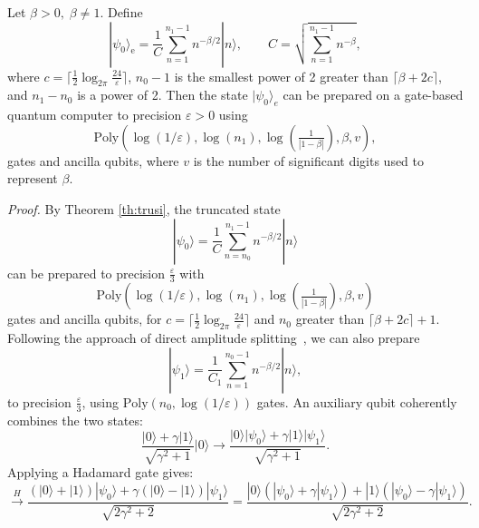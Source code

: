 \documentclass[aps,pra,twocolumn,superscriptaddress,preprintnumbers,amsmath,amssymb]{revtex4-2}
\begin{document}
\begin{corollary}
    \label{co:extended}

    Let $\beta>0,\;\beta\neq1$. Define 
    \begin{equation}
        |\psi_0\rangle_{\mathrm{e}}=\frac{1}{C}\sum_{n=1}^{n_1-1}n^{-\beta/2}|n\rangle, \qquad C=\sqrt{\sum_{n=1}^{n_1-1}n^{-\beta}},
    \end{equation}
    where $c = \lceil \frac{1}{2} \log_{2\pi} \frac{24}{\varepsilon} \rceil$, $n_0 - 1$ is the smallest power of 2 greater than $\lceil \beta + 2c \rceil$, and $n_1 - n_0$ is a power of 2. Then the state $|\psi_0\rangle_e$ can be prepared on a gate-based quantum computer to precision $\varepsilon > 0$ using
    \begin{equation}
        \mathrm{Poly}(\log(1/\varepsilon),\log(n_1),\log(\tfrac{1}{|1-\beta|}),\beta,v),
    \end{equation}
    gates and ancilla qubits, where $v$ is the number of significant digits used to represent $\beta$.
\end{corollary}
\noindent\textit{Proof.} 
By Theorem \ref{th:trusi}, the truncated state
\begin{equation}
    |\psi_0\rangle=\frac{1}{C}\sum_{n=n_0}^{n_1-1}n^{-\beta/2}|n\rangle
\end{equation}
  can be prepared to precision $\frac{\varepsilon}{3}$ with
 \begin{equation}
     \mathrm{Poly}(\log(1/\varepsilon),\log(n_1),\log(\tfrac{1}{|1-\beta|}),\beta,v)
 \end{equation}
 gates and ancilla qubits, for $c = \lceil \frac{1}{2} \log_{2\pi} \frac{24}{\varepsilon} \rceil$ and $n_0$  greater than $\lceil \beta + 2c \rceil + 1$. Following the approach of direct amplitude splitting~\cite{long2001efficient}, we can also prepare
 \begin{equation}
     |\psi_1\rangle=\frac{1}{C_1}\sum_{n=1}^{n_0-1}n^{-\beta/2}|n\rangle,
 \end{equation}
to precision $\frac{\varepsilon}{3}$, using $\mathrm{Poly}(n_0,\log(1/\varepsilon))$ gates. An auxiliary qubit coherently combines the two states:
\begin{equation}
    \frac{|0\rangle+\gamma|1\rangle}{\sqrt{\gamma^2+1}}|0\rangle
    \rightarrow \frac{|0\rangle|\psi_0\rangle+\gamma|1\rangle|\psi_1\rangle}{\sqrt{\gamma^2+1}}.
\end{equation}
Applying a Hadamard gate gives:
\begin{equation}
    \xrightarrow{H} \frac{(|0\rangle+|1\rangle)|\psi_0\rangle+\gamma(|0\rangle-|1\rangle)|\psi_1\rangle}{\sqrt{2\gamma^2+2}}
    =\frac{|0\rangle (|\psi_0\rangle+\gamma|\psi_1\rangle)+|1\rangle(|\psi_0\rangle-\gamma|\psi_1\rangle)}{\sqrt{2\gamma^2+2}}.
\end{equation}
\end{document}
